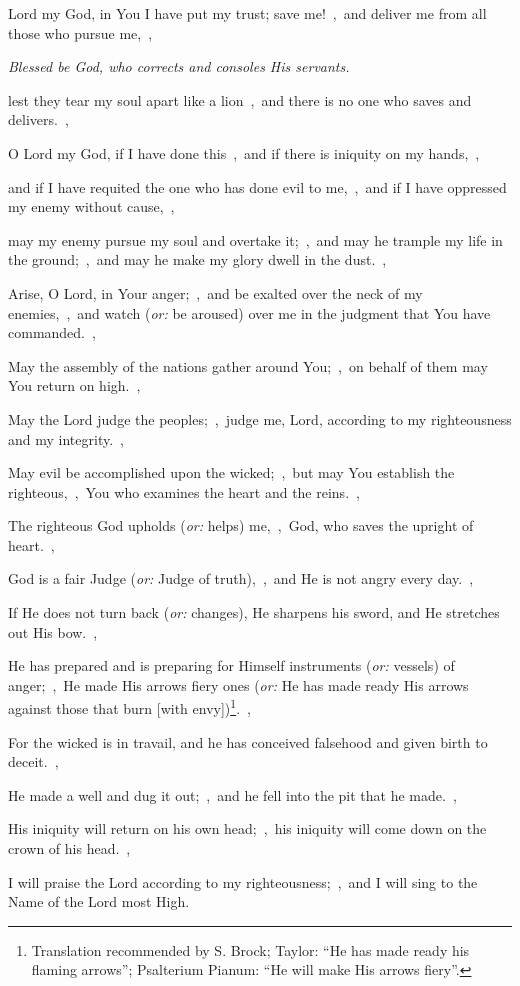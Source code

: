 \documentclass[12pt,twoside,a5paper]{article}
\newcommand{\qanona}[1]{{\liturgicalhint{Qanona.} \emph{#1}}}
\newcommand{\translationoption}[1]{\emph{or:} #1}
\begin{document}
\begin{normalparskip}
  Lord my God, in You I have put my trust; save me!~\sep\ and deliver me from all those who pursue me,~\sep

  \qanona{Blessed be God, who corrects and consoles His servants.}

  lest they tear my soul apart like a lion~\sep\ and there is no one who saves and delivers.~\sep

  O Lord my God, if I have done this~\sep\ and if there is iniquity on my hands,~\sep

  and if I have requited the one who has done evil to me,~\sep\ and if I have oppressed my enemy without cause,~\sep

  may my enemy pursue my soul and overtake it;~\sep\ and may he trample my life in the ground;~\sep\ and may he make my glory dwell in the dust.~\sep

  Arise, O Lord, in Your anger;~\sep\ and be exalted over the neck of my enemies,~\sep\ and watch (\translationoption{be aroused}) over me in the judgment that You have commanded.~\sep

  May the assembly of the nations gather around You;~\sep\ on behalf of them may You return on high.~\sep

  May the Lord judge the peoples;~\sep\ judge me, Lord, according to my righteousness and my integrity.~\sep

  May evil be accomplished upon the wicked;~\sep\ but may You establish the righteous,~\sep\ You who examines the heart and the reins.~\sep

  The righteous God upholds (\translationoption{helps}) me,~\sep\ God, who saves the upright of heart.~\sep

  God is a fair Judge (\translationoption{Judge of truth}),~\sep\ and He is not angry every day.~\sep

  If He does not turn back (\translationoption{changes}), He sharpens his sword, and He stretches out His bow.~\sep

  He has prepared and is preparing for Himself instruments (\translationoption{vessels}) of anger;~\sep\ He made His arrows fiery ones (\translationoption{He has made ready His arrows against those that burn [with envy]})\footnote{Translation recommended by S. Brock; Taylor: ``He has made ready his flaming arrows''; Psalterium Pianum: ``He will make His arrows fiery''.}.~\sep

  For the wicked is in travail, and he has conceived falsehood and given birth to deceit.~\sep

  He made a well and dug it out;~\sep\ and he fell into the pit that he made.~\sep

  His iniquity will return on his own head;~\sep\ his iniquity will come down on the crown of his head.~\sep

  I will praise the Lord according to my righteousness;~\sep\ and I will sing to the Name of the Lord most High.
\end{normalparskip}
\end{document}
